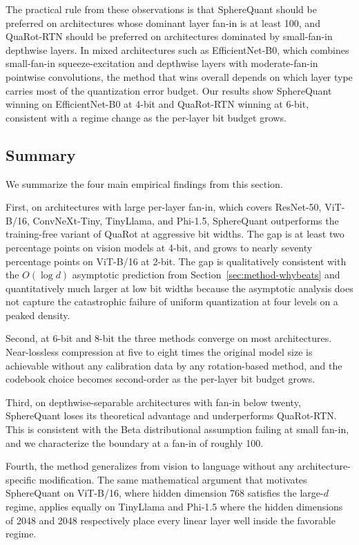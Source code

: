 The practical rule from these observations is that SphereQuant should be
preferred on architectures whose dominant layer fan-in is at least
100, and QuaRot-RTN should be preferred on architectures dominated by
small-fan-in depthwise layers. In mixed architectures such as
EfficientNet-B0, which combines small-fan-in squeeze-excitation and
depthwise layers with moderate-fan-in pointwise convolutions, the
method that wins overall depends on which layer type carries most of
the quantization error budget. Our results show SphereQuant winning on
EfficientNet-B0 at 4-bit and QuaRot-RTN winning at 6-bit, consistent
with a regime change as the per-layer bit budget grows.

\subsection{Summary}
\label{sec:experiments-summary}

We summarize the four main empirical findings from this section.

First, on architectures with large per-layer fan-in, which covers
ResNet-50, ViT-B/16, ConvNeXt-Tiny, TinyLlama, and Phi-1.5, SphereQuant
outperforms the training-free variant of QuaRot at aggressive bit
widths. The gap is at least two percentage points on vision models at
4-bit, and grows to nearly seventy percentage points on ViT-B/16 at
2-bit. The gap is qualitatively consistent with the $O(\log d)$
asymptotic prediction from Section~\ref{sec:method-whybeats} and
quantitatively much larger at low bit widths because the asymptotic
analysis does not capture the catastrophic failure of uniform
quantization at four levels on a peaked density.

Second, at 6-bit and 8-bit the three methods converge on most
architectures. Near-lossless compression at five to eight times the
original model size is achievable without any calibration data by any
rotation-based method, and the codebook choice becomes second-order
as the per-layer bit budget grows.

Third, on depthwise-separable architectures with fan-in below twenty,
SphereQuant loses its theoretical advantage and underperforms QuaRot-RTN. This
is consistent with the Beta distributional assumption failing at small
fan-in, and we characterize the boundary at a fan-in of roughly 100.

Fourth, the method generalizes from vision to language without any
architecture-specific modification. The same mathematical argument
that motivates SphereQuant on ViT-B/16, where hidden dimension 768 satisfies the
large-$d$ regime, applies equally on TinyLlama and Phi-1.5 where the
hidden dimensions of 2048 and 2048 respectively place every linear
layer well inside the favorable regime.
